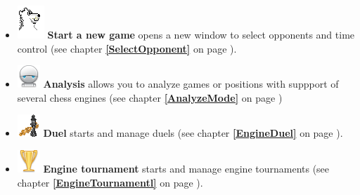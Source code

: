 \documentclass[11pt,a4paper]{article}
\begin{document}
	\begin{itemize}
		\item \includegraphics[scale=0.6]{BearChessIcon.png} \textbf{Start a new game} opens a new window to select opponents and time control (see chapter \textbf{\ref{SelectOpponent}  } on page \pageref{SelectOpponent}).
		
		\item \includegraphics[scale=0.5]{robot.png} \textbf{Analysis} allows you to analyze games or positions with suppport of several chess engines (see chapter \textbf{\ref{AnalyzeMode}  } on page \pageref{AnalyzeMode})
		
		\item \includegraphics[scale=0.5]{6-2-chess-png.png} \textbf{Duel} starts and manage duels (see chapter  \textbf{\ref{EngineDuel}  } on page \pageref{EngineDuel} ).
		
		\item \includegraphics[scale=0.5]{cup_gold.png} \textbf{Engine tournament} starts and manage engine tournaments (see chapter  \textbf{\ref{EngineTournamentl}  } on page \pageref{EngineTournamentl} ).
		

\end{itemize}
\end{document}
